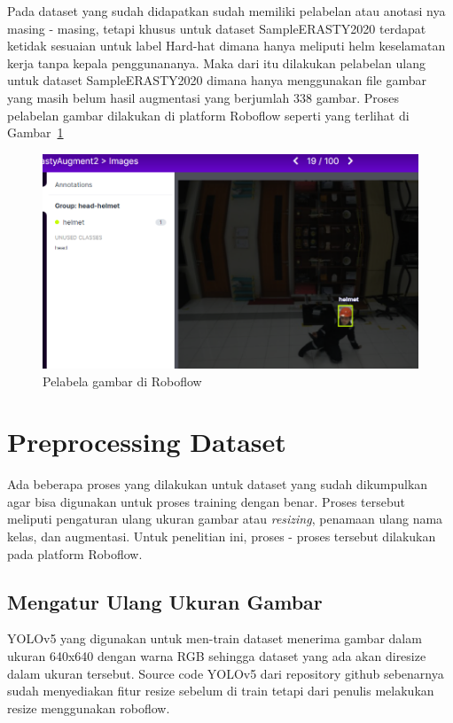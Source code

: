 Pada dataset yang sudah didapatkan sudah memiliki pelabelan atau anotasi nya masing - masing, tetapi khusus untuk dataset SampleERASTY2020 terdapat ketidak sesuaian untuk label Hard-hat dimana hanya meliputi helm keselamatan kerja tanpa kepala penggunananya. Maka dari itu  dilakukan pelabelan ulang untuk dataset SampleERASTY2020 dimana hanya menggunakan file gambar yang masih belum hasil augmentasi yang berjumlah 338 gambar. Proses pelabelan gambar dilakukan di platform Roboflow seperti yang terlihat di Gambar~\ref{fig:gambarbesertalabel}

\begin{figure}[ht]
  \centering
  \includegraphics[width=1\textwidth]{gambar/labeldiroboflow.png}
  \caption{Pelabela gambar di Roboflow}
  \label{fig:gambarbesertalabel}  
\end{figure}

\section{Preprocessing Dataset}
\label{sec:preprocessing}
\par Ada beberapa proses yang dilakukan untuk dataset yang sudah dikumpulkan agar bisa digunakan untuk proses training dengan benar. Proses tersebut meliputi pengaturan ulang ukuran gambar atau \emph{resizing}, penamaan ulang nama kelas, dan augmentasi. Untuk penelitian ini, proses - proses tersebut dilakukan pada platform Roboflow.


\subsection{Mengatur Ulang Ukuran Gambar}
\par YOLOv5 yang digunakan untuk men-train dataset menerima gambar dalam ukuran 640x640 dengan warna RGB sehingga dataset yang ada akan diresize dalam ukuran tersebut. Source code YOLOv5 dari repository github sebenarnya sudah menyediakan fitur resize sebelum di train tetapi dari penulis melakukan resize menggunakan roboflow. 

